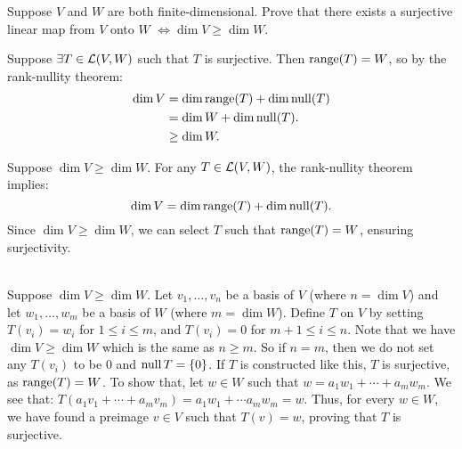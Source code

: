 \begin{xrcs}
  Suppose $V$ and $W$ are both finite-dimensional. Prove that there exists a surjective linear map from $V$ onto $W$
  $
    \iff \dim V \geq \dim W.
  $
\end{xrcs}
\begin{prf}
  \Rightarrowdirection Suppose $\exists T \in \mathcal{L}(V,W)$ such that $T$ is surjective. Then $\operatorname{range}(T) = W$, so by the rank-nullity theorem:
  \begin{equation}
    \begin{aligned}
      \dim V &=    \dim \operatorname{range}(T) + \dim \operatorname{null}(T) \\
             &=    \dim W + \dim \operatorname{null}(T). \\
             &\geq \dim W.
    \end{aligned}
  \end{equation}

  \Leftarrowdirection Suppose $\dim V \geq \dim W$. For any $T \in \mathcal{L}(V,W)$, the rank-nullity theorem implies:
  \begin{equation}
    \dim V = \dim \operatorname{range}(T) + \dim \operatorname{null}(T).
  \end{equation}
  Since $\dim V \geq \dim W$, we can select $T$ such that $\operatorname{range}(T) = W$, ensuring surjectivity.

   \\
  Suppose $\dim V \geq \dim W$. Let $v_1, \dots, v_n$ be a basis of $V$ (where $n = \dim V$) and let $w_1, \dots, w_m$ be a basis of $W$ (where $m = \dim W$).  Define $T$ on $V$ by setting $T(v_i) = w_i$ for $1 \leq i \leq m$, and $T(v_i) = 0$ for $m+1 \leq i \leq n$. Note that we have $\dim V \geq \dim W$ which is the same as $n \geq m$. So if $n = m$, then we do not set any $T(v_i)$ to be $0$ and $\operatorname{null} T = \{0\}$. If $T$ is constructed like this, $T$ is surjective, as $\operatorname{range}(T) = W$. To show that, let $w \in W$ such that
  $
    w = a_1 w_1 + \cdots + a_m w_m.
  $
  We see that: $T(a_1 v_1 + \cdots + a_m v_m)= a_1 w_1 + \cdots a_m w_m = w$. Thus, for every $w \in W$, we have found a preimage $v \in V$ such that $T(v) = w$, proving that $T$ is surjective.
\end{prf}

